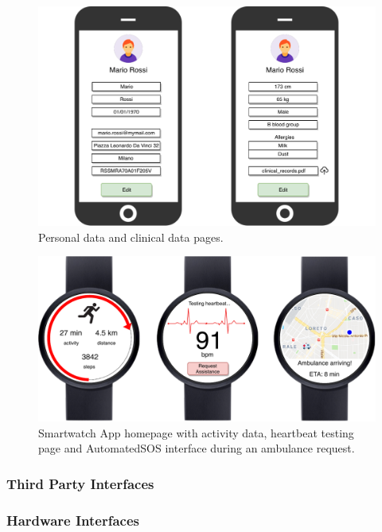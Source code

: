 \documentclass[12pt,a4paper]{article}
\begin{document}
		        \begin{figure}[H]
		        	\centering
		        	\includegraphics[width=1.0\linewidth]{Images/data-pages}
		        	\caption{Personal data and clinical data pages.}
		        	\label{fig:data-pages}
		        \end{figure}
	            \begin{figure}[h]
				 	\centering
				 	\includegraphics[width=1.0\linewidth]{Images/smartwatch}
				 	\caption{Smartwatch App homepage with activity data, heartbeat testing page and AutomatedSOS interface during an ambulance request.}
				 	\label{fig:smartwatch}
				 \end{figure}
			\newpage
			\subsubsection{Third Party Interfaces}
				
			\newpage
			\subsubsection{Hardware Interfaces}
\end{document}
